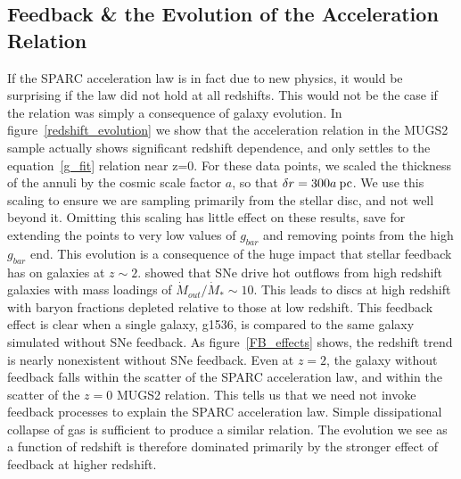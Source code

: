 \subsection{Feedback \& the Evolution of the Acceleration Relation}
If the SPARC acceleration law is in fact due to new physics, it would be
surprising if the law did not hold at all redshifts.  This would not be the case
if the relation was simply a consequence of galaxy evolution.  In
figure~\ref{redshift_evolution} we show that the acceleration relation in the MUGS2
sample actually shows significant redshift dependence, and only settles to
the equation~\ref{g_fit} relation near z=0.  For these data points, we scaled
the thickness of the annuli by the cosmic scale factor $a$, so that $\delta r =
300a\>{\rm pc}$.  We use this scaling to ensure we are sampling primarily from the
stellar disc, and not well beyond it.  Omitting this scaling has little effect
on these results, save for extending the points to very low values of $g_{bar}$
and removing points from the high $g_{bar}$ end.  This evolution is a
consequence of the huge impact that stellar feedback has on galaxies at
$z\sim2$.  \citet{Keller2015} showed that SNe drive hot outflows from high
redshift galaxies with mass loadings of $\dot M_{out}/\dot M_* \sim 10$.  This
leads to discs at high redshift with baryon fractions depleted relative to those at
low redshift.  This feedback effect is clear when a single galaxy, g1536, is
compared to the same galaxy simulated without SNe feedback.  As
figure~\ref{FB_effects} shows, the redshift trend is nearly nonexistent without SNe
feedback.  Even at $z=2$, the galaxy without feedback falls within the scatter
of the SPARC acceleration law, and within the scatter of the $z=0$ MUGS2
relation.  This tells us that we need not invoke feedback processes to explain
the SPARC acceleration law.  Simple dissipational collapse of gas is sufficient
to produce a similar relation.  The evolution we see as a function of redshift
is therefore dominated primarily by the stronger effect of feedback at higher
redshift.

